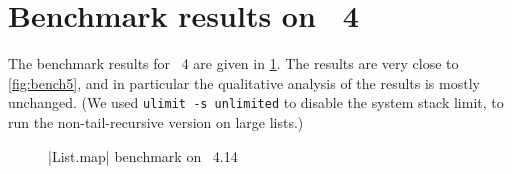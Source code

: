 \section{Benchmark results on \OCaml~4}

The benchmark results for \OCaml~4 are given in \cref{fig:bench4}. The
results are very close to \cref{fig:bench5}, and in particular the
qualitative analysis of the results is mostly unchanged. (We used
\texttt{ulimit -s unlimited} to disable the system stack limit, to run
the non-tail-recursive version on large lists.)

\begin{figure}[tp]
\def\svgscale{0.8}
\graphicspath{{plots/}}

\caption{\ocaml|List.map| benchmark on \OCaml~4.14}
\label{fig:bench4}
\end{figure}

